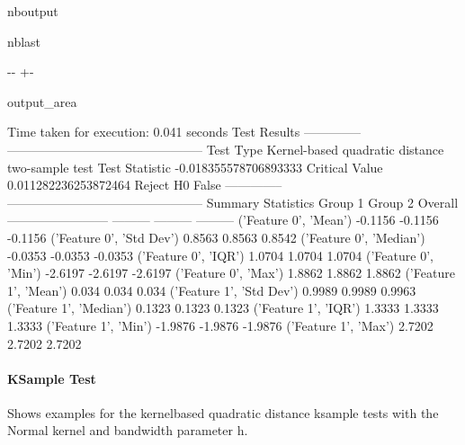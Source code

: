 \documentclass[letterpaper,10pt,english,openany,oneside]{sphinxmanual}
\begin{document}
\begin{sphinxuseclass}{nboutput}
\begin{sphinxuseclass}{nblast}
{

\kern-\sphinxverbatimsmallskipamount\kern-\baselineskip
\kern+\FrameHeightAdjust\kern-\fboxrule
\vspace{\nbsphinxcodecellspacing}

\begin{sphinxuseclass}{output_area}
\begin{sphinxuseclass}{}


\begin{sphinxVerbatim}[commandchars=\\\{\}]
Time taken for execution: 0.041 seconds
Test Results
--------------  -----------------------------------------------
Test Type       Kernel-based quadratic distance two-sample test
Test Statistic  -0.018355578706893333
Critical Value  0.011282236253872464
Reject H0       False
--------------  -----------------------------------------------
Summary Statistics
                            Group 1    Group 2    Overall
------------------------  ---------  ---------  ---------
('Feature 0', 'Mean')       -0.1156    -0.1156    -0.1156
('Feature 0', 'Std Dev')     0.8563     0.8563     0.8542
('Feature 0', 'Median')     -0.0353    -0.0353    -0.0353
('Feature 0', 'IQR')         1.0704     1.0704     1.0704
('Feature 0', 'Min')        -2.6197    -2.6197    -2.6197
('Feature 0', 'Max')         1.8862     1.8862     1.8862
('Feature 1', 'Mean')        0.034      0.034      0.034
('Feature 1', 'Std Dev')     0.9989     0.9989     0.9963
('Feature 1', 'Median')      0.1323     0.1323     0.1323
('Feature 1', 'IQR')         1.3333     1.3333     1.3333
('Feature 1', 'Min')        -1.9876    -1.9876    -1.9876
('Feature 1', 'Max')         2.7202     2.7202     2.7202
\end{sphinxVerbatim}



\end{sphinxuseclass}
\end{sphinxuseclass}
}

\end{sphinxuseclass}
\end{sphinxuseclass}

\paragraph{K\sphinxhyphen{}Sample Test}
\label{\detokenize{user_guide/basic_usage:K-Sample-Test}}
\sphinxAtStartPar
Shows examples for the kernel\sphinxhyphen{}based quadratic distance k\sphinxhyphen{}sample tests with the Normal kernel and bandwidth parameter h.
\end{document}
